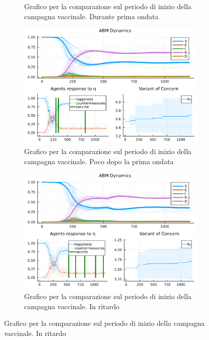 \begin{figure}[H]
\begin{subfigure}[b]{0.45\textwidth}
		\caption{Grafico per la comparazione sul periodo di inizio della campagna vaccinale. Durante prima ondata}
		\label{fig:comparison_all_2}
	\end{subfigure}
	\hfill
	\begin{subfigure}[b]{0.45\textwidth}
		\centering
		\includegraphics[width=\textwidth]{img/SocialNetworkABM_1_A.png}
		\caption{Grafico per la comparazione sul periodo di inizio della campagna vaccinale. Poco dopo la prima ondata}
		\label{fig:comparison_all_3}
	\end{subfigure}
	\hfill
	\begin{subfigure}[b]{0.45\textwidth}
		\centering
		\includegraphics[width=\textwidth]{img/SocialNetworkABM_3_A.png}
		\caption{Grafico per la comparazione sul periodo di inizio della campagna vaccinale. In ritardo}
		\label{fig:comparison_all_4}
	\end{subfigure}
\end{figure}
\newpage

